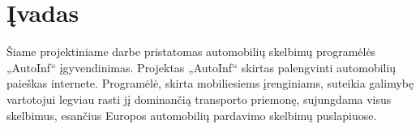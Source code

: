 \documentclass[12pt]{article}
\begin{document}
	\tableofcontents
	\pagebreak

	\section*{Įvadas}
	
	\begin{flushleft}
	Šiame projektiniame darbe pristatomas automobilių skelbimų programėlės „AutoInf“ įgyvendinimas. Projektas „AutoInf“ skirtas  palengvinti automobilių paieškas internete. Programėlė, skirta mobiliesiems įrenginiams, suteikia galimybę vartotojui legviau rasti jį dominančią transporto priemonę, sujungdama visus skelbimus, esančius Europos automobilių pardavimo skelbimų puslapiuose.
	\end{flushleft}		
	
	
	
	
	
	
	
	
	
	
	\pagebreak
\end{document}
